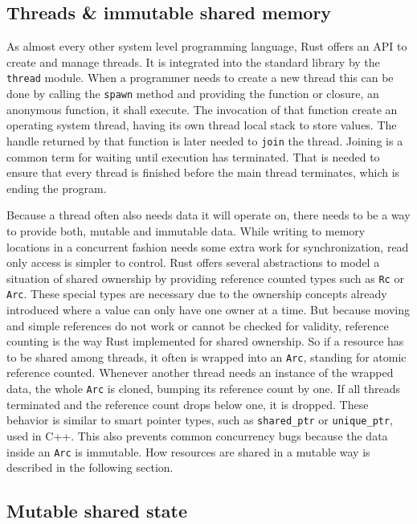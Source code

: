 \subsection{Threads \& immutable shared memory}

As almost every other system level programming language, Rust offers an \ac{API} to create and manage threads. It is integrated into the standard library by the \texttt{thread} module. When a programmer needs to create a new thread this can be done by calling the \texttt{spawn} method and providing the function or closure, an anonymous function, it shall execute. The invocation of that function create an operating system thread, having its own thread local stack to store values. The handle returned by that function is later needed to \texttt{join} the thread. Joining is a common term for waiting until execution has terminated. That is needed to ensure that every thread is finished before the main thread terminates, which is ending the program.

Because a thread often also needs data it will operate on, there needs to be a way to provide both, mutable and immutable data. While writing to memory locations in a concurrent fashion needs some extra work for synchronization, read only access is simpler to control. Rust offers several abstractions to model a situation of shared ownership by providing reference counted types such as \texttt{Rc} or \texttt{Arc}. These special types are necessary due to the ownership concepts already introduced where a value can only have one owner at a time. But because moving and simple references do not work or cannot be checked for validity, reference counting is the way Rust implemented for shared ownership. So if a resource has to be shared among threads, it often is wrapped into an \texttt{Arc}, standing for atomic reference counted. Whenever another thread needs an instance of the wrapped data, the whole \texttt{Arc} is cloned, bumping its reference count by one. If all threads terminated and the reference count drops below one, it is dropped. These behavior is similar to smart pointer types, such as \texttt{shared\_ptr} or \texttt{unique\_ptr}, used in C++. This also prevents common concurrency bugs because the data inside an \texttt{Arc} is immutable. How resources are shared in a mutable way is described in the following section.

\subsection{Mutable shared state}

